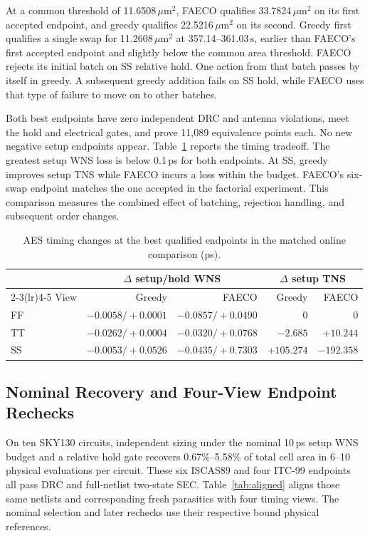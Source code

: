\documentclass[journal]{IEEEtran}
\newcommand{\um}{\ensuremath{\mu\mathrm{m}^{2}}}
\begin{document}
At a common threshold of 11.6508\,\um, FAECO qualifies 33.7824\,\um{} on its first accepted endpoint, and greedy qualifies 22.5216\,\um{} on its second. Greedy first qualifies a single swap for 11.2608\,\um{} at 357.14--361.03\,s, earlier than FAECO's first accepted endpoint and slightly below the common area threshold. FAECO rejects its initial batch on SS relative hold. One action from that batch passes by itself in greedy. A subsequent greedy addition fails on SS hold, while FAECO uses that type of failure to move on to other batches.

Both best endpoints have zero independent DRC and antenna violations, meet the hold and electrical gates, and prove 11,089 equivalence points each. No new negative setup endpoints appear. Table~\ref{tab:aes_greedy_timing} reports the timing tradeoff. The greatest setup WNS loss is below 0.1\,ps for both endpoints. At SS, greedy improves setup TNS while FAECO incurs a loss within the budget. FAECO's six-swap endpoint matches the one accepted in the factorial experiment. This comparison measures the combined effect of batching, rejection handling, and subsequent order changes.

\begin{table}[t]
\centering
\caption{AES timing changes at the best qualified endpoints in the matched online comparison (ps).}
\label{tab:aes_greedy_timing}
\footnotesize
\setlength{\tabcolsep}{2.5pt}
\begin{tabular}{lrrrr}
\toprule
& \multicolumn{2}{c}{\(\Delta\) setup/hold WNS} & \multicolumn{2}{c}{\(\Delta\) setup TNS}\\
\cmidrule(lr){2-3}\cmidrule(lr){4-5}
View & Greedy & FAECO & Greedy & FAECO\\
\midrule
FF & \(-0.0058/+0.0001\) & \(-0.0857/+0.0490\) & \(0\) & \(0\)\\
TT & \(-0.0262/+0.0004\) & \(-0.0320/+0.0768\) & \(-2.685\) & \(+10.244\)\\
SS & \(-0.0053/+0.0526\) & \(-0.0435/+0.7303\) & \(+105.274\) & \(-192.358\)\\
\bottomrule
\end{tabular}
\end{table}

\subsection{Nominal Recovery and Four-View Endpoint Rechecks}

On ten SKY130 circuits, independent sizing under the nominal 10\,ps setup WNS budget and a relative hold gate recovers 0.67\%--5.58\% of total cell area in 6--10 physical evaluations per circuit. These six ISCAS89 and four ITC-99 endpoints all pass DRC and full-netlist two-state SEC. Table~\ref{tab:aligned} aligns those same netlists and corresponding fresh parasitics with four timing views. The nominal selection and later rechecks use their respective bound physical references.
\end{document}
